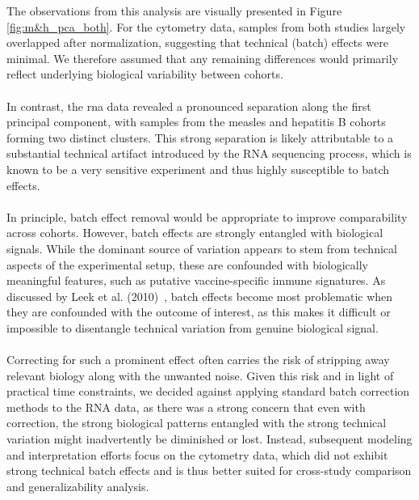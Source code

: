 \documentclass[12pt,a4paper]{report}
\begin{document}
\noindent
The observations from this analysis are visually presented in Figure \ref{fig:m&h_pca_both}. For the cytometry data, samples from both studies largely overlapped after normalization, suggesting that technical (batch) effects were minimal. We therefore assumed that any remaining differences would primarily reflect underlying biological variability between cohorts.\\
\\
In contrast, the \acrshort{rna} data revealed a pronounced separation along the first principal component, with samples from the measles and hepatitis B cohorts forming two distinct clusters. This strong separation is likely attributable to a substantial technical artifact introduced by the RNA sequencing process, which is known to be a very sensitive experiment and thus highly susceptible to batch effects.\\ 
\\
In principle, batch effect removal would be appropriate to improve comparability across cohorts. However, batch effects are strongly entangled with biological signals. While the dominant source of variation appears to stem from technical aspects of the experimental setup, these are confounded with biologically meaningful features, such as putative vaccine-specific immune signatures. As discussed by Leek et al. (2010)~\cite{Leek2010Tackling}, batch effects become most problematic when they are confounded with the outcome of interest, as this makes it difficult or impossible to disentangle technical variation from genuine biological signal.\\
\\
Correcting for such a prominent effect often carries the risk of stripping away relevant biology along with the unwanted noise. Given this risk and in light of practical time constraints, we decided against applying standard batch correction methods to the RNA data, as there was a strong concern that even with correction, the strong biological patterns entangled with the strong technical variation might inadvertently be diminished or lost. Instead, subsequent modeling and interpretation efforts focus on the cytometry data, which did not exhibit strong technical batch effects and is thus better suited for cross-study comparison and generalizability analysis.
\end{document}
